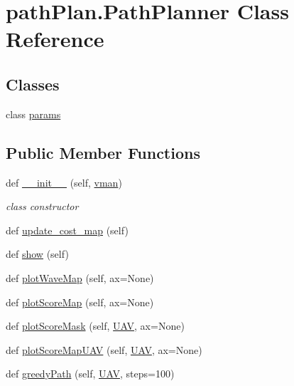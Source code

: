 \hypertarget{classpath_plan_1_1_path_planner}{}\section{path\+Plan.\+Path\+Planner Class Reference}
\label{classpath_plan_1_1_path_planner}
\subsection*{Classes}
\begin{DoxyCompactItemize}
\item 
class \mbox{\hyperlink{classpath_plan_1_1_path_planner_1_1params}{params}}
\end{DoxyCompactItemize}
\subsection*{Public Member Functions}
\begin{DoxyCompactItemize}
\item 
def \mbox{\hyperlink{classpath_plan_1_1_path_planner_a4725d91c2d54372bbfecfce0a71a3552}{\+\_\+\+\_\+init\+\_\+\+\_\+}} (self, \mbox{\hyperlink{classpath_plan_1_1_path_planner_a8e31f83f0d8983286bb3746da568af81}{vman}})
\begin{DoxyCompactList}\small\item\em class constructor \end{DoxyCompactList}\item 
def \mbox{\hyperlink{classpath_plan_1_1_path_planner_a3ec1a61977be524a6d7099f4e4cd83b1}{update\+\_\+cost\+\_\+map}} (self)
\item 
def \mbox{\hyperlink{classpath_plan_1_1_path_planner_ac2b91da25e1f81aa210e83d502f9a008}{show}} (self)
\item 
def \mbox{\hyperlink{classpath_plan_1_1_path_planner_ad0aac3259a17970adbb7652d32365f44}{plot\+Wave\+Map}} (self, ax=None)
\item 
def \mbox{\hyperlink{classpath_plan_1_1_path_planner_abe0f6150b91e41dc9625d29a7005e37d}{plot\+Score\+Map}} (self, ax=None)
\item 
def \mbox{\hyperlink{classpath_plan_1_1_path_planner_a6e74d35801d637631580333ea9210aa5}{plot\+Score\+Mask}} (self, \mbox{\hyperlink{classpath_plan_1_1_u_a_v}{U\+AV}}, ax=None)
\item 
def \mbox{\hyperlink{classpath_plan_1_1_path_planner_aa5506bc585bd5f1d3fa76d0e383b0cc2}{plot\+Score\+Map\+U\+AV}} (self, \mbox{\hyperlink{classpath_plan_1_1_u_a_v}{U\+AV}}, ax=None)
\item 
def \mbox{\hyperlink{classpath_plan_1_1_path_planner_aa578a0dcb25eed4782bb660d8b71b731}{greedy\+Path}} (self, \mbox{\hyperlink{classpath_plan_1_1_u_a_v}{U\+AV}}, steps=100)
\end{DoxyCompactItemize}
